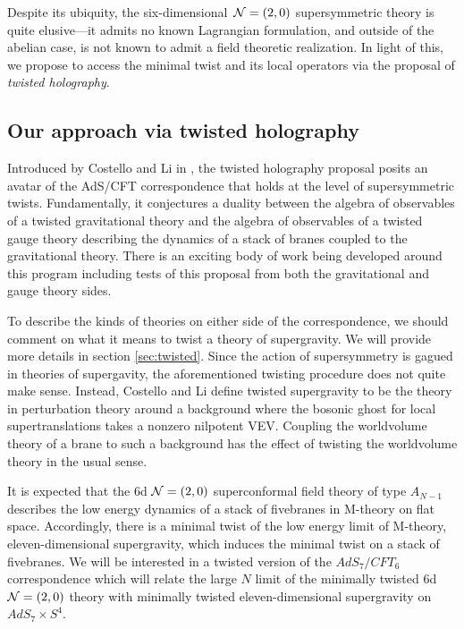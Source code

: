 Despite its ubiquity, the six-dimensional~$\mathcal N=(2,0)$ supersymmetric theory is quite elusive---it admits no known Lagrangian formulation, and outside of the abelian case, is not known to admit a field theoretic realization.
In light of this, we propose to access the minimal twist and its local operators via the proposal of \textit{twisted holography}.

\subsection{Our approach via twisted holography}
Introduced by Costello and Li in \cite{CLsugra}, the twisted holography proposal posits an avatar of the AdS/CFT correspondence that holds at the level of supersymmetric twists.
Fundamentally, it conjectures a duality between the algebra of observables of a twisted gravitational theory and the algebra of observables of a twisted gauge theory describing the dynamics of a stack of branes coupled to the gravitational theory. There is an exciting body of work being developed around this program including tests of this proposal from both the gravitational and gauge theory sides.

To describe the kinds of theories on either side of the correspondence, we should comment on what it means to twist a theory of supergravity. We will provide more details in section \ref{sec:twisted}. Since the action of supersymmetry is gagued in theories of supergavity, the aforementioned twisting procedure does not quite make sense. Instead, Costello and Li define twisted supergravity to be the theory in perturbation theory around a background where the bosonic ghost for local supertranslations takes a nonzero nilpotent VEV. Coupling the worldvolume theory of a brane to such a background has the effect of twisting the worldvolume theory in the usual sense.

It is expected that the 6d $\mathcal N=(2,0)$ superconformal field theory of type $A_{N-1}$ describes the low energy dynamics of a stack of fivebranes in M-theory on flat space. Accordingly, there is a minimal twist of the low energy limit of M-theory, eleven-dimensional supergravity, which induces the minimal twist on a stack of fivebranes. We will be interested in a twisted version of the $AdS_{7}/CFT_{6}$ correspondence which will relate the large $N$ limit of the minimally twisted 6d $\mathcal N=(2,0)$ theory with minimally twisted eleven-dimensional supergravity on $AdS_{7}\times S^{4}$.

